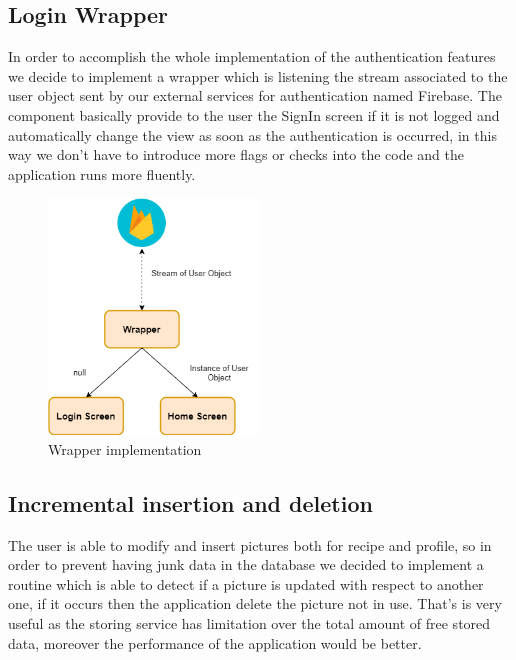 \subsection{Login Wrapper}
In order to accomplish the whole implementation of the authentication features we decide to implement a wrapper which is listening the stream associated to the user object sent by our external services for authentication named Firebase.
The component basically provide to the user the SignIn screen if it is not logged and automatically change the view as soon as the authentication is occurred, in this way we don't have to introduce more flags or checks into the code and the application runs more fluently.
\begin{figure}[H]
		\begin{center}
			\centering
			\includegraphics[width=0.5\textwidth]{img/Wrapper.png}
			\caption{Wrapper implementation}
		\end{center}
	\end{figure}
\subsection{Incremental insertion and deletion}
The user is able to modify and insert pictures both for recipe and profile, so in order to prevent having junk data in the database we decided to implement a routine which is able to detect if a picture is updated with respect to another one, if it occurs then the application delete the picture not in use.
That's is very useful as the storing service has limitation over the total amount of free stored data, moreover the performance of the application would be better.
